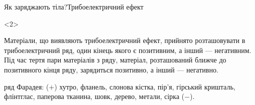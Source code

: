 \documentclass{beamer}
\begin{document}
\begin{frame}{Як заряджають тіла?}{Трибоелектричний ефект}
	\begin{onlyenv}
		\begin{block}{}\justifying\small
			Матеріали, що виявляють трибоелектричний ефект, прийнято
			розташовувати в \alert{трибоелектричний ряд}, один кінець якого є
			позитивним, а інший --- негативним. Під час тертя пари матеріалів
			з ряду, матеріал, розташований ближче до позитивного кінця ряду,
			зарядиться позитивно, а інший --- негативно.

			\bigskip

			ряд Фарадея: ($+$) хутро, фланель, слонова кістка, пір'я, гірський
			кришталь, флінтглас, паперова тканина, шовк, дерево, метали, сірка
			($-$).
		\end{block}
	\end{onlyenv}
\end{frame}


%
%
%
\end{document}
